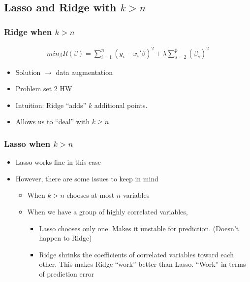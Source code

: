 \documentclass[
  shownotes,
  xcolor={svgnames},
  hyperref={colorlinks,citecolor=DarkBlue,linkcolor=DarkRed,urlcolor=DarkBlue}
  , aspectratio=169]{beamer}
\begin{document}
\subsection{Lasso and Ridge with $k>n$ }
\begin{frame}[fragile]
\frametitle{Ridge when $k>n$}

\begin{align}
min_{\beta} R(\beta) = \sum_{i=1}^n (y_i-x_i'\beta)^2 + \lambda \sum_{s=2}^p (\beta_s)^2
\end{align}

\bigskip
\begin{itemize}
  \item Solution $\rightarrow$ data augmentation
  \medskip
  \item Problem set 2 HW
  \medskip
  \item Intuition: Ridge ``adds'' $k$ additional points.
  \medskip
  \item Allows us to ``deal'' with $k\geq n$
\end{itemize}

\end{frame}
\begin{frame}[fragile]
\frametitle{Lasso when $k>n$}

\begin{itemize}
  \item Lasso works fine in this case
  \medskip
  \item However, there are some issues to keep in mind
  \begin{itemize}
    \medskip
  \item When $k>n$ chooses at most $n$ variables
  \medskip
  \item When we have a group of highly correlated variables, 
  \medskip
    \begin{itemize}
      \item Lasso chooses only one. Makes it unstable for prediction. (Doesn't happen to Ridge)
      \medskip
      \item Ridge shrinks the coefficients of correlated variables toward each other. This makes Ridge ``work'' better than Lasso. ``Work'' in terms of prediction error
    \end{itemize}
  \end{itemize}  
  \medskip
  
\end{itemize}



\end{frame}
\end{document}
